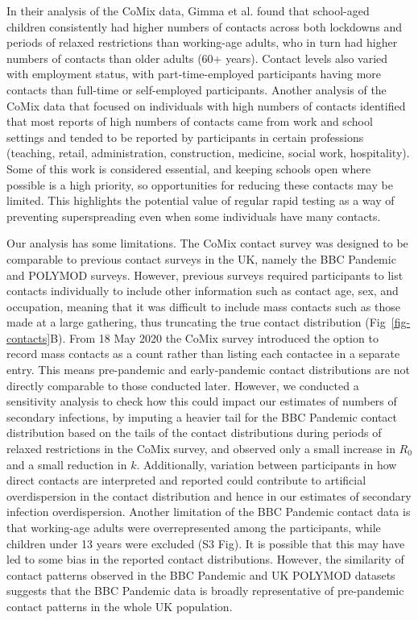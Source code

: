 \documentclass[
  10pt,
  letterpaper,
]{article}
\begin{document}
In their analysis of the CoMix data, Gimma et al. \citep{gimma2022}
found that school-aged children consistently had higher numbers of
contacts across both lockdowns and periods of relaxed restrictions than
working-age adults, who in turn had higher numbers of contacts than
older adults (60+ years). Contact levels also varied with employment
status, with part-time-employed participants having more contacts than
full-time or self-employed participants. Another analysis of the CoMix
data that focused on individuals with high numbers of contacts
\citep{chapman2021} identified that most reports of high numbers of
contacts came from work and school settings and tended to be reported by
participants in certain professions (teaching, retail, administration,
construction, medicine, social work, hospitality). Some of this work is
considered essential, and keeping schools open where possible is a high
priority, so opportunities for reducing these contacts may be limited.
This highlights the potential value of regular rapid testing as a way of
preventing superspreading even when some individuals have many contacts.

Our analysis has some limitations. The CoMix contact survey was designed
to be comparable to previous contact surveys in the UK, namely the BBC
Pandemic \citep{klepac2018, klepac2020, kucharski2020} and POLYMOD
\citep{mossong2008} surveys. However, previous surveys required
participants to list contacts individually to include other information
such as contact age, sex, and occupation, meaning that it was difficult
to include mass contacts such as those made at a large gathering, thus
truncating the true contact distribution (Fig~\ref{fig-contacts}B). From
18 May 2020 the CoMix survey introduced the option to record mass
contacts as a count rather than listing each contactee in a separate
entry. This means pre-pandemic and early-pandemic contact distributions
are not directly comparable to those conducted later. However, we
conducted a sensitivity analysis to check how this could impact our
estimates of numbers of secondary infections, by imputing a heavier tail
for the BBC Pandemic contact distribution based on the tails of the
contact distributions during periods of relaxed restrictions in the
CoMix survey, and observed only a small increase in \(R_0\) and a small
reduction in \(k\). Additionally, variation between participants in how
direct contacts are interpreted and reported could contribute to
artificial overdispersion in the contact distribution and hence in our
estimates of secondary infection overdispersion. Another limitation of
the BBC Pandemic contact data is that working-age adults were
overrepresented among the participants, while children under 13 years
were excluded (S3 Fig). It is possible that this may have led to some
bias in the reported contact distributions. However, the similarity of
contact patterns observed in the BBC Pandemic and UK POLYMOD datasets
\citep{klepac2020} suggests that the BBC Pandemic data is broadly
representative of pre-pandemic contact patterns in the whole UK
population.
\end{document}
